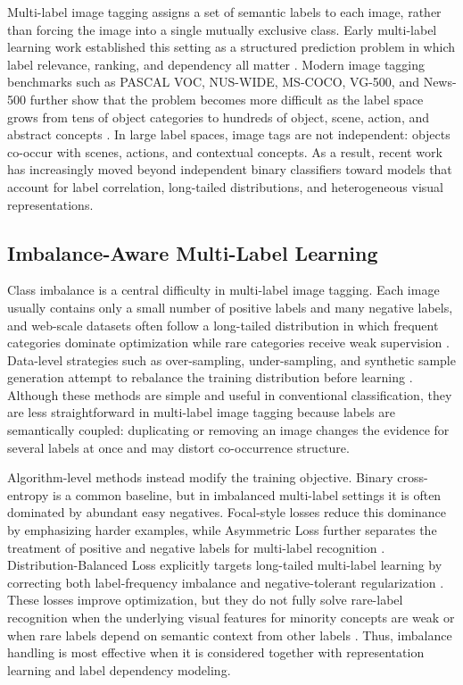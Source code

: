\documentclass[10pt,journal,compsoc]{IEEEtran}
\begin{document}
Multi-label image tagging assigns a set of semantic labels to each image, rather than forcing the image into a single mutually exclusive class. Early multi-label learning work established this setting as a structured prediction problem in which label relevance, ranking, and dependency all matter \cite{zhang2005mlknn,elisseeff2001kernel}. Modern image tagging benchmarks such as PASCAL VOC, NUS-WIDE, MS-COCO, VG-500, and News-500 further show that the problem becomes more difficult as the label space grows from tens of object categories to hundreds of object, scene, action, and abstract concepts \cite{everingham2011pascal,chua2009nus,lin2014coco,chen2020knowledge,lanchantin2021general}. In large label spaces, image tags are not independent: objects co-occur with scenes, actions, and contextual concepts. As a result, recent work has increasingly moved beyond independent binary classifiers toward models that account for label correlation, long-tailed distributions, and heterogeneous visual representations.

\subsection{Imbalance-Aware Multi-Label Learning}

Class imbalance is a central difficulty in multi-label image tagging. Each image usually contains only a small number of positive labels and many negative labels, and web-scale datasets often follow a long-tailed distribution in which frequent categories dominate optimization while rare categories receive weak supervision \cite{altalhan2025imbalanced,li2022trustworthy}. Data-level strategies such as over-sampling, under-sampling, and synthetic sample generation attempt to rebalance the training distribution before learning \cite{altalhan2025imbalanced}. Although these methods are simple and useful in conventional classification, they are less straightforward in multi-label image tagging because labels are semantically coupled: duplicating or removing an image changes the evidence for several labels at once and may distort co-occurrence structure.

Algorithm-level methods instead modify the training objective. Binary cross-entropy is a common baseline, but in imbalanced multi-label settings it is often dominated by abundant easy negatives. Focal-style losses reduce this dominance by emphasizing harder examples, while Asymmetric Loss further separates the treatment of positive and negative labels for multi-label recognition \cite{wang2022survey,ridnik2021asymmetric}. Distribution-Balanced Loss explicitly targets long-tailed multi-label learning by correcting both label-frequency imbalance and negative-tolerant regularization \cite{wu2020distribution}. These losses improve optimization, but they do not fully solve rare-label recognition when the underlying visual features for minority concepts are weak or when rare labels depend on semantic context from other labels \cite{li2022targeted}. Thus, imbalance handling is most effective when it is considered together with representation learning and label dependency modeling.
\end{document}
